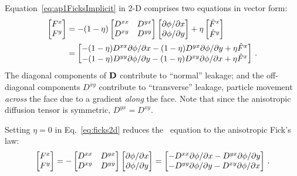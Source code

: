 Equation~\eqref{eq:ap1FicksImplicit} in 2-D comprises two equations in vector
form:
\begin{align}\label{eq:ficks2d}
  \begin{bmatrix}
    F^{x} \\
    F^{y}
  \end{bmatrix}
  &= - (1 - \eta)
  \begin{bmatrix}
    D^{xx} & D^{yx} \\
    D^{xy} & D^{yy}
  \end{bmatrix}
  \begin{bmatrix}
    {\partial \phi}/{\partial x} \\
    {\partial \phi}/{\partial y}
  \end{bmatrix}
  + \eta
  \begin{bmatrix}
    \hat{F}^{x} \\
    \hat{F}^{y}
  \end{bmatrix}
  \\ \nonumber
  &= 
  \begin{bmatrix}
    - (1 - \eta)D^{xx} {\partial \phi}/{\partial x}
    - (1 - \eta)D^{yx} {\partial \phi}/{\partial y}
    + \eta \hat{F}^{x}
    \\
    - (1 - \eta)D^{yy} {\partial \phi}/{\partial y}
    - (1 - \eta)D^{xy} {\partial \phi}/{\partial x}
    + \eta \hat{F}^{x}
  \end{bmatrix}
  \,.
\end{align}
The diagonal components of $\mathbf{D}$ contribute to ``normal''
leakage; and the off-diagonal components $D^{xy}$ contribute to ``transverse''
leakage, particle movement \emph{across} the face due to a gradient
\emph{along} the face.
Note that since the anisotropic diffusion tensor is symmetric,
$D^{yx}=D^{xy}$.

Setting $\eta=0$ in Eq.~\eqref{eq:ficks2d} reduces the \APone\ equation to
the anisotropic Fick's law:
\begin{equation}\label{eq:adFicks2d}
  \begin{bmatrix}
    F^{x} \\
    F^{y}
  \end{bmatrix}
  = -
  \begin{bmatrix}
    D^{xx} & D^{yx} \\
    D^{xy} & D^{yy}
  \end{bmatrix}
  \begin{bmatrix}
    {\partial \phi}/{\partial x} \\
    {\partial \phi}/{\partial y}
  \end{bmatrix}
  = 
  \begin{bmatrix}
    - D^{xx} {\partial \phi}/{\partial x}
    - D^{yx} {\partial \phi}/{\partial y}
    \\
    - D^{yy} {\partial \phi}/{\partial y}
    - D^{xy} {\partial \phi}/{\partial x}
  \end{bmatrix}
  \,.
\end{equation}

